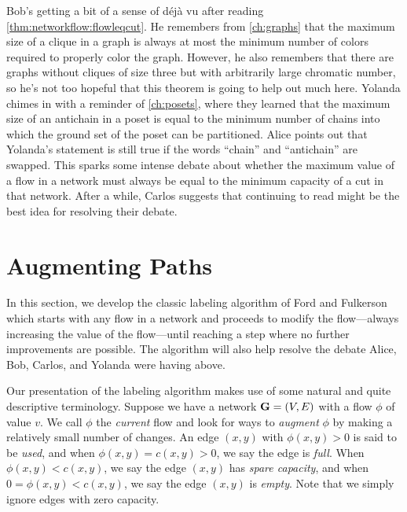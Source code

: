 \begin{discussion}
  Bob's getting a bit of a sense of d\'ej\`a vu after reading
  \autoref{thm:networkflow:flowleqcut}. He remembers from
  \autoref{ch:graphs} that the maximum size of a clique in a graph is
  always at most the minimum number of colors required to properly
  color the graph. However, he also remembers that there are graphs
  without cliques of size three but with arbitrarily large chromatic
  number, so he's not too hopeful that this theorem is going to help
  out much here. Yolanda chimes in with a reminder of
  \autoref{ch:posets}, where they learned that the maximum size of an
  antichain in a poset is equal to the minimum number of chains into
  which the ground set of the poset can be partitioned. Alice points
  out that Yolanda's statement is still true if the words ``chain'' and
  ``antichain'' are swapped. This sparks some intense debate about
  whether the maximum value of a flow in a network must always be
  equal to the minimum capacity of a cut in that network. After a
  while, Carlos suggests that continuing to read might be the best
  idea for resolving their debate.
\end{discussion}

\section{Augmenting Paths}\label{s:networkflow:augmenting}

In this section, we develop the classic labeling algorithm of
Ford and Fulkerson which starts with any flow in a network and
proceeds to modify the flow---always increasing 
the value of the flow---until reaching a step
where no further improvements are possible. The algorithm will also
help resolve the debate Alice, Bob, Carlos, and Yolanda were having
above.

Our presentation of the labeling algorithm makes use of some natural
and quite descriptive terminology.  Suppose we have a network $\mathbf{G}=(V,E)$
with a flow $\phi$ of value $v$.  We call $\phi$ the \textit{current}
flow and look for ways to \textit{augment} $\phi$ by making a
relatively small number of changes.  An edge $(x,y)$ with
$\phi(x,y)>0$ is said to be \textit{used}, and when
$\phi(x,y)=c(x,y)>0$, we say the edge is \textit{full}.  When
$\phi(x,y)<c(x,y)$, we say the edge $(x,y)$ has \textit{spare
  capacity}, and when $0=\phi(x,y)<c(x,y)$, we say the edge $(x,y)$
is \textit{empty}.  Note that we simply ignore edges with zero
capacity.


